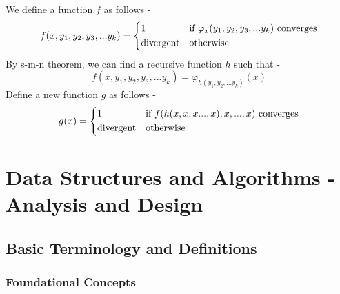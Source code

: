 \documentclass[openany]{book}
\begin{document}
\begin{exercise} \\
    We define a function $f$ as follows -
    $$f(x, y_1, y_2, y_3, ... y_k) = \begin{dcases}
        1 & \text{if } \varphi_x(y_1, y_2, y_3, ... y_k) \text{ converges} \\
        \text{divergent} & \text{otherwise}
    \end{dcases}$$
    By s-m-n theorem, we can find a recursive function $h$ such that -
    $$f(x, y_1, y_2, y_3, ... y_k) = \varphi_{h(y_1, y_2, ... y_k)}(x)$$
    Define a new function $g$ as follows -
    $$g(x) = \begin{dcases}
        1 & \text{if } f(h(x, x, x..., x), x, ..., x) \text{ converges} \\
        \text{divergent} & \text{otherwise}
    \end{dcases}$$
\end{exercise}












\part{Data Structures and Algorithms - Analysis and Design}
\chapter{Basic Terminology and Definitions}
\section{Foundational Concepts}
\end{document}

